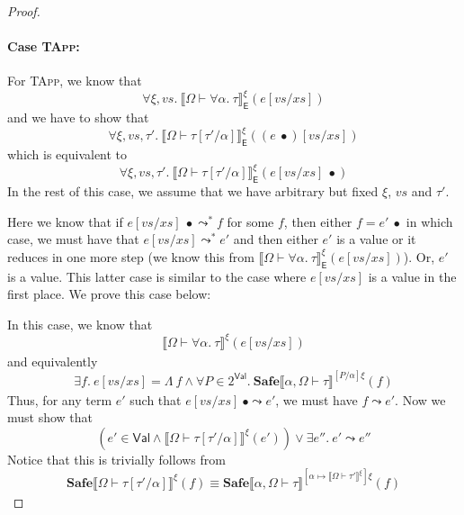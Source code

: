 \documentclass{article}
\newcommand{\EXP}{\mathsf{E}}
\newcommand{\VAL}{\mathsf{Val}}
\newcommand{\semtyp}[2]{\llbracket #2 \rrbracket_{#1}}
\begin{document}
\begin{proof}
\paragraph{Case \textsc{TApp}:}
For \textsc{TApp}, we know that
\[
\forall \xi, \mathit{vs}.~\semtyp{\EXP}{\Omega \vdash \forall \alpha.~\tau}^{\xi}(e[\mathit{vs}/\mathit{xs}])
\]
and we have to show that
\[
\forall \xi, \mathit{vs}, \tau'.~\semtyp{\EXP}{\Omega \vdash \tau[\tau'/\alpha]}^{\xi}((e~\bullet)[\mathit{vs}/\mathit{xs}])
\]
which is equivalent to
\[
\forall \xi, \mathit{vs}, \tau'.~\semtyp{\EXP}{\Omega \vdash \tau[\tau'/\alpha]}^{\xi}(e[\mathit{vs}/\mathit{xs}]~\bullet)
\]
In the rest of this case, we assume that we have arbitrary
but fixed $\xi$, $\mathit{vs}$ and $\tau'$.

Here we know that if $e[\mathit{vs}/\mathit{xs}]~\bullet \leadsto^* f$
for some $f$, then either $f = e'~\bullet$ in which case, we must 
have that $e[\mathit{vs}/\mathit{xs}] \leadsto^* e'$ and then
either $e'$ is a value or it reduces in one more step
(we know this from $\semtyp{\EXP}{\Omega \vdash \forall \alpha.~\tau}^{\xi}(e[\mathit{vs}/\mathit{xs}])$).
Or, $e'$ is a value. This latter case is similar to the case where $e[\mathit{vs}/\mathit{xs}]$ is a value in the first place.
We prove this case below:

In this case, we know that
\[
\semtyp{}{\Omega \vdash \forall \alpha.~\tau}^{\xi}(e[\mathit{vs}/\mathit{xs}])
\]
and equivalently
\[
\exists f.~e[\mathit{vs}/\mathit{xs}] = \Lambda~f \land
\forall P \in 2^{\VAL}.~\mathbf{Safe}{\semtyp{}{\alpha, \Omega \vdash \tau}
^{[P/\alpha]\xi}}(f)
\]
Thus, for any term $e'$ such that
$e[\mathit{vs}/\mathit{xs}]~\bullet \leadsto e'$, we must have
$f \leadsto e'$.
Now we must show that
\[
(e' \in \VAL \land 
\semtyp{}{\Omega \vdash \tau[\tau'/\alpha]}^{\xi}(e'))
\lor
\exists e''.~e' \leadsto e''
\]
Notice that this is trivially follows from
\[
\mathbf{Safe}{\semtyp{}{\Omega \vdash \tau[\tau'/\alpha]}
^{\xi}}(f)
\equiv
\mathbf{Safe}{\semtyp{}{\alpha, \Omega \vdash \tau}
^{[\alpha \mapsto \semtyp{}{\Omega \vdash \tau'}^{\xi}]\xi}}(f)
\]


\end{proof}
\end{document}
